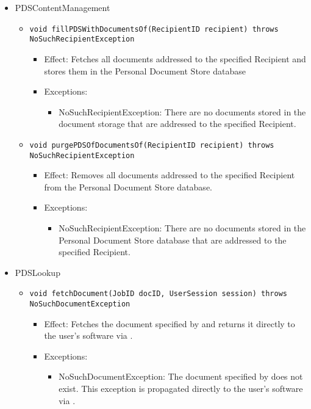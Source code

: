 \begin{itemize}
	\item PDSContentManagement
	\begin{itemize}
		\item \texttt{void fillPDSWithDocumentsOf(RecipientID recipient) throws NoSuchRecipientException}
		\begin{itemize}
			\item Effect: Fetches all documents addressed to the specified Recipient and stores them in the Personal Document Store database
			\item Exceptions:
			\begin{itemize}
				\item NoSuchRecipientException: There are no documents stored in the document storage that are addressed to the specified Recipient.
			\end{itemize}
		\end{itemize}
				
		\item \texttt{void purgePDSOfDocumentsOf(RecipientID recipient) throws NoSuchRecipientException}
		\begin{itemize}
			\item Effect: Removes all documents addressed to the specified Recipient from the Personal Document Store database.
			\item Exceptions:
			\begin{itemize}
				\item NoSuchRecipientException: There are no documents stored in the Personal Document Store database that are addressed to the specified Recipient.
			\end{itemize}
		\end{itemize}
	\end{itemize}
	
	\item PDSLookup
	\begin{itemize}
		\item \texttt{void fetchDocument(JobID docID, UserSession session) throws NoSuchDocumentException}
		\begin{itemize}
			\item Effect: Fetches the document specified by  and returns it directly to the user's software via .
			\item Exceptions:
			\begin{itemize}
				\item NoSuchDocumentException: The document specified by  does not exist. This exception is propagated directly to the user's software via .
			\end{itemize}
		\end{itemize}
				

\end{itemize}
\end{itemize}
